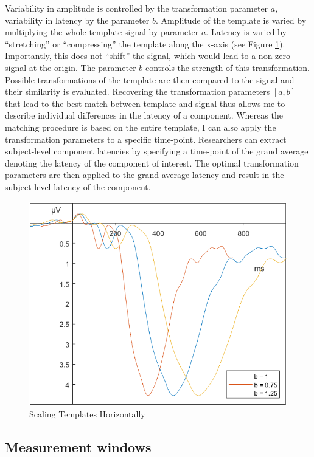 \documentclass[
  man]{apa7}
\begin{document}
Variability in amplitude is controlled by the transformation parameter \(a\), variability in latency by the parameter \(b\). Amplitude of the template is varied by multiplying the whole template-signal by parameter \(a\). Latency is varied by ``stretching'' or ``compressing'' the template along the x-axis (see Figure \ref{fig:b-scale-example}). Importantly, this does not ``shift'' the signal, which would lead to a non-zero signal at the origin. The parameter \(b\) controls the strength of this transformation. Possible transformations of the template are then compared to the signal and their similarity is evaluated. Recovering the transformation parameters \([a, b]\) that lead to the best match between template and signal thus allows me to describe individual differences in the latency of a component. Whereas the matching procedure is based on the entire template, I can also apply the transformation parameters to a specific time-point. Researchers can extract subject-level component latencies by specifying a time-point of the grand average denoting the latency of the component of interest. The optimal transformation parameters are then applied to the grand average latency and result in the subject-level latency of the component.



\begin{figure}
\includegraphics[width=0.75\linewidth]{images/b_scale} \caption{Scaling Templates Horizontally}\label{fig:b-scale-example}
\end{figure}

\hypertarget{measurement-windows}{%
\subsection{Measurement windows}\label{measurement-windows}}
\end{document}
